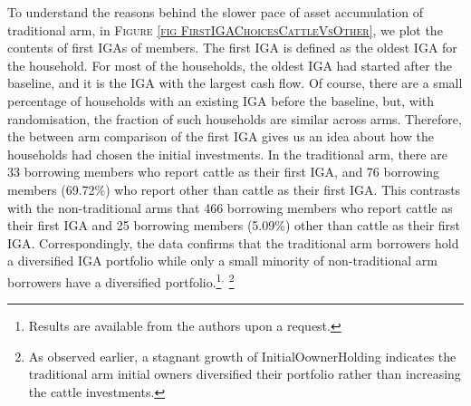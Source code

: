 	To understand the reasons behind the slower pace of asset accumulation of \textsf{traditional} arm, %
	in \textsc{\footnotesize Figure \ref{fig FirstIGAChoicesCattleVsOther}}, we plot the contents of first IGAs of members. The first IGA is defined as the oldest IGA for the household. For most of the households, the oldest IGA had started after the baseline, and it is the IGA with the largest cash flow. Of course, there are a small percentage of households with an existing IGA before the baseline, but, with randomisation, the fraction of such households are similar across arms. Therefore, the between arm comparison of the first IGA gives us an idea about how the households had chosen the initial investments. In the \textsf{traditional} arm, there are 33 borrowing members who report cattle as their first IGA, and 76 borrowing members (69.72\%) who report other than cattle as their first IGA. This contrasts with the non-\textsf{traditional} arms that 466 borrowing members who report cattle as their first IGA and 25 borrowing members (5.09\%) other than cattle as their first IGA. Correspondingly, the data confirms that the \textsf{traditional} arm borrowers hold a diversified IGA portfolio while only a small minority of non-\textsf{traditional} arm borrowers have a diversified portfolio.\footnote{Results are available from the authors upon a request. }$^{,}$ \footnote{As observed earlier, a stagnant growth of \textsf{InitialOownerHolding} indicates the \textsf{traditional} arm initial owners diversified their portfolio rather than increasing the cattle investments. }
